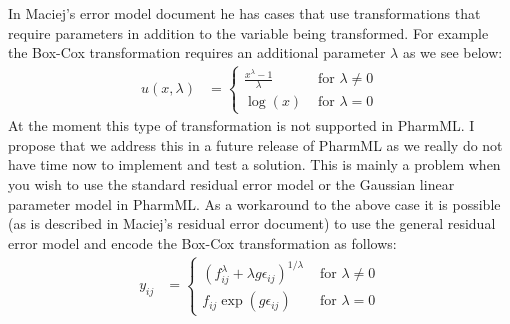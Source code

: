 \documentclass[a4paper,10pt]{article}
\newcommand{\pharmml}{PharmML\xspace}
\begin{document}
In Maciej's error model document he has cases that use transformations
that require parameters in addition to the variable being
transformed. For example the Box-Cox transformation requires an
additional parameter $\lambda$ as we see below:
%
\begin{align*}
u(x, \lambda) &=
\begin{cases}
\frac{x^\lambda -1}{\lambda} & \text{ for } \lambda \neq 0\\
\log(x) & \text{ for } \lambda = 0
\end{cases}
\end{align*}
%
At the moment this type of transformation is not supported in
\pharmml. I propose that we address this in a future release of
\pharmml as we really do not have time now to implement and test a
solution. This is mainly a problem when you wish to use the standard
residual error model or the Gaussian linear parameter model in
\pharmml. As a workaround to the above case it is possible (as is
described in Maciej's residual error document) to use the general
residual error model and encode the Box-Cox transformation as follows:
%
\begin{align*}
y_{ij} &=
\begin{cases}
\left( f_{ij}^\lambda + \lambda g \epsilon_{ij} \right)^{1/\lambda} &
\text{ for } \lambda \neq 0\\
f_{ij} \exp(g \epsilon_{ij}) & \text{ for } \lambda = 0
\end{cases}
\end{align*}


\end{document}

